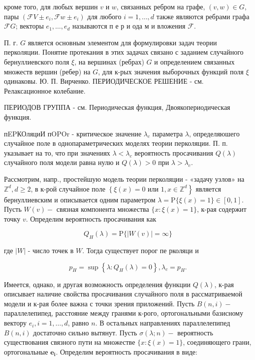 \documentclass[10pt]{article}
\begin{document}
кроме того, для любых вершин $v$ и $w$, связанных ребром на графе, $(v, w) \in G$, пары $\left(\mathscr{F} V \pm e_{i}, \mathscr{F} w \pm e_{i}\right)$ для любого $i=1, \ldots, d$ также являются ребрами графа $\mathscr{F} G$; векторы $e_{1}, \ldots, e_{d}$ называются п е р и ода м и вложения $\mathscr{F}$.



П. г. $G$ является основным элементом для формулировки задач теории перколяции. Понятие протекания в этих задачах связано с заданием случайного бернуллиевского поля $\xi$, на вершинах (ребрах) $G$ и определением связанных множеств вершин (ребер) на $G$, для к-рых значения выборочных функций поля $\xi$ одинаковы. Ю. П. Вирченко. ПЕРИОДИЧЕСКОЕ РЕШЕНИЕ - см. Релаксационное колебание.



ПЕРИОДОВ ГРУППА - см. Периодическая функция, Двоякопериодическая функция.



пEPКОляциИ пOPOr - критическое значение $\lambda_{c}$ параметра $\lambda$, определяюшего случайное поле в однопараметрических моделях теории перколяции. П. п. указывает на то, что при значениях $\lambda<\lambda_{c}$ вероятность просачивания $Q(\lambda)$ случайного поля модели равна нулю и $Q(\lambda)>0$ при $\lambda>\lambda_{c}$.



Рассмотрим, напр., простейшую модель теории перколяции - «задачу узлов» на $\mathbb{Z}^{d}, d \geqslant 2$, в к-рой случайное поле $\left\{\xi(x)=0\right.$ или $\left.1, x \in \mathbb{Z}^{d}\right\}$ является бернуллиевским и описывается одним параметром $\lambda=\mathrm{P}\{\xi(x)=1\} \in[0,1]$. Пусть $W(v)-$ связная компонента множества $\{x: \xi(x)=1\}$, к-рая содержит точку $v$. Определим вероятность просачивания как



\[

Q_{H}(\lambda)=\mathrm{P}\{|W(v)|=\infty\}

\]



где $|W|$ - число точек в $W$. Тогда существует порог пе рколяци и



\[

p_{H}=\sup \left\{\lambda: Q_{H}(\lambda)=0\right\}, \lambda_{c}=p_{H} .

\]



Имеется, однако, и другая возможность определения функции $Q(\lambda)$, к-рая описывает наличие свойства просачивания случайного поля в рассматриваемой модели и к-рая более важна с точки зрения приложений. Пусть $B(n, i)-$ параллелепипед, расстояние между гранями к-рого, ортогональными базисному вектору $e_{i}, i=1, \ldots, d$, равно $n$. В остальных направлениях параллелепипед $B(n, i)$ достаточно сильно вытянут. Пусть $\sigma(\lambda ; n)-$ вероятность существования связного пути на множестве $\{x: \xi(x)=1\}$, соединяющего грани, ортогональные $\boldsymbol{e}_{\boldsymbol{i}}$. Определим вероятность просачивания в виде:
\end{document}
